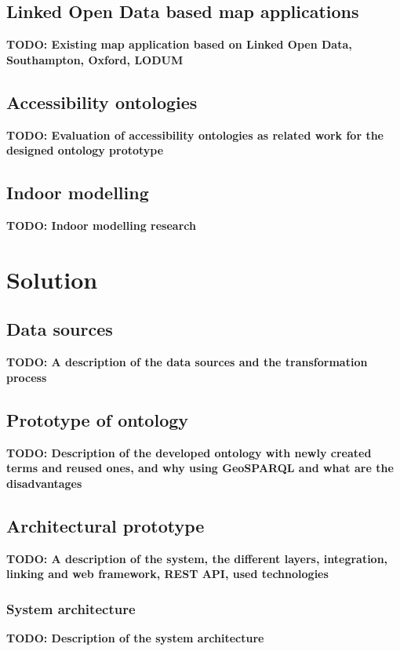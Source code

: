 \documentclass[draft,final]{vutinfth} %
\newcommand{\todo}[1]{{\color{red}\textbf{TODO: {#1}}}} %
\begin{document}
\section{Linked Open Data based map applications}
\label{related-work-map-app}


\todo{Existing map application based on Linked Open Data, Southampton, Oxford, LODUM}


\section{Accessibility ontologies}
\label{related-work-accessibility-ontologies}
\todo{Evaluation of accessibility ontologies as related work for the designed ontology prototype}

\section{Indoor modelling}
\label{related-work-accessibility-ontologies}
\todo{Indoor modelling research}

\chapter{Solution}
\label{solution-chapter}

\section{Data sources}
\todo{A description of the data sources and the transformation process}

\section{Prototype of ontology}
\todo{Description of the developed ontology with newly created terms and reused ones, and why using GeoSPARQL and what are the disadvantages}

\section{Architectural prototype}
\todo{A description of the system, the different layers, integration, linking and web framework, REST API, used technologies}

\subsection{System architecture}
\todo{Description of the system architecture}
\end{document}
